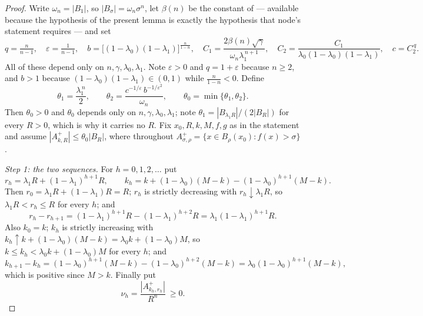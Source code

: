 \begin{proof}
Write $\omega_n=|B_1|$, so $|B_\sigma|=\omega_n\sigma^n$, let $\beta(n)$ be the
constant of  --- available because the
hypothesis  of the present lemma is exactly the
hypothesis that node's statement requires --- and set
\[
q=\tfrac n{n-1},\quad \varepsilon=\tfrac1{n-1},\quad
b=\bigl[(1-\lambda_0)(1-\lambda_1)\bigr]^{\frac n{1-n}},\quad
C_1=\frac{2\beta(n)\sqrt\gamma}{\omega_n\lambda_1^{\,n+1}},\quad
C_2=\frac{C_1}{\lambda_0(1-\lambda_0)(1-\lambda_1)},\quad
c=C_2^{\,q} .
\]
All of these depend only on $n,\gamma,\lambda_0,\lambda_1$.  Note $\varepsilon>0$
and $q=1+\varepsilon$ because $n\ge2$, and $b>1$ because
$(1-\lambda_0)(1-\lambda_1)\in(0,1)$ while $\frac n{1-n}<0$.  Define
\[
\theta_1=\frac{\lambda_1^{\,n}}2,\qquad
\theta_2=\frac{c^{-1/\varepsilon}\,b^{-1/\varepsilon^2}}{\omega_n},\qquad
\theta_0=\min\{\theta_1,\theta_2\} .
\]
Then $\theta_0>0$ and $\theta_0$ depends only on $n,\gamma,\lambda_0,\lambda_1$;
note $\theta_1=|B_{\lambda_1R}|/(2|B_R|)$ for every $R>0$, which is why it carries
no $R$.  Fix $x_0,R,k,M,f,g$ as in the statement and assume
$|A^+_{k,R}|\le\theta_0|B_R|$, where throughout
$A^+_{\sigma,\rho}=\{x\in B_\rho(x_0):f(x)>\sigma\}$.

\emph{Step 1: the two sequences.}  For $h=0,1,2,\dots$ put
\[
r_h=\lambda_1R+(1-\lambda_1)^{h+1}R,\qquad
k_h=k+(1-\lambda_0)(M-k)-(1-\lambda_0)^{h+1}(M-k).
\]
Then $r_0=\lambda_1R+(1-\lambda_1)R=R$; $r_h$ is strictly decreasing with
$r_h\downarrow\lambda_1R$, so $\lambda_1R<r_h\le R$ for every $h$; and
\[
r_h-r_{h+1}=(1-\lambda_1)^{h+1}R-(1-\lambda_1)^{h+2}R=\lambda_1(1-\lambda_1)^{h+1}R .
\]
Also $k_0=k$; $k_h$ is strictly increasing with
$k_h\uparrow k+(1-\lambda_0)(M-k)=\lambda_0k+(1-\lambda_0)M$, so
$k\le k_h<\lambda_0k+(1-\lambda_0)M$ for every $h$; and
\[
k_{h+1}-k_h=(1-\lambda_0)^{h+1}(M-k)-(1-\lambda_0)^{h+2}(M-k)
=\lambda_0(1-\lambda_0)^{h+1}(M-k) ,
\]
which is positive since $M>k$.  Finally put
\[
\nu_h=\frac{|A^+_{k_h,r_h}|}{R^n}\ \ge 0 .
\]


\end{proof}
